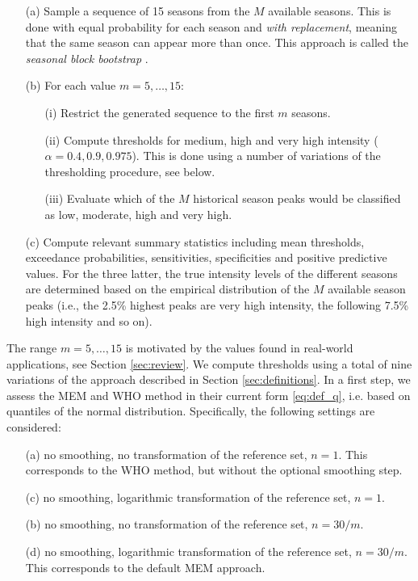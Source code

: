 \documentclass[12pt]{article}
\begin{document}
\begin{itemize}
\item[(a)] Sample a sequence of 15 seasons from the $M$ available seasons. This is done with equal probability for each season and \textit{with replacement}, meaning that the same season can appear more than once. This approach is called the \textit{seasonal block bootstrap} \citep{Politis2001}.
\item[(b)] For each value $m = 5, \dots, 15$:
\begin{itemize}
\item[(i)] Restrict the generated sequence to the first $m$ seasons.
\item[(ii)] Compute thresholds for medium, high and very high intensity ($\alpha = 0.4, 0.9, 0.975$). This is done using a number of variations of the thresholding procedure, see below.
\item[(iii)] Evaluate which of the $M$ historical season peaks would be classified as low, moderate, high and very high.
\end{itemize}
\item[(c)] Compute relevant summary statistics including mean thresholds, exceedance probabilities, sensitivities, specificities and positive predictive values. For the three latter, the true intensity levels of the different seasons are determined based on the empirical distribution of the $M$ available season peaks (i.e., the 2.5\% highest peaks are very high intensity, the following 7.5\% high intensity and so on).
\end{itemize}
The range $m =5, \dots, 15$ is motivated by the values found in real-world applications, see Section \ref{sec:review}. We compute thresholds using a total of nine variations of the approach described in Section \ref{sec:definitions}. In a first step, we assess the MEM and WHO method in their current form \eqref{eq:def_q}, i.e. based on quantiles of the normal distribution. Specifically, the following settings are considered:
\begin{enumerate}
\item[(a)] no smoothing, no transformation of the reference set, $n = 1$. This corresponds to the WHO method, but without the optional smoothing step.
\item[(c)] no smoothing, logarithmic transformation of the reference set, $n = 1$.
\item[(b)] no smoothing, no transformation of the reference set, $n = 30/m$.
\item[(d)] no smoothing, logarithmic transformation of the reference set, $n = 30/m$. This corresponds to the default MEM approach.
\end{enumerate}
\end{document}
